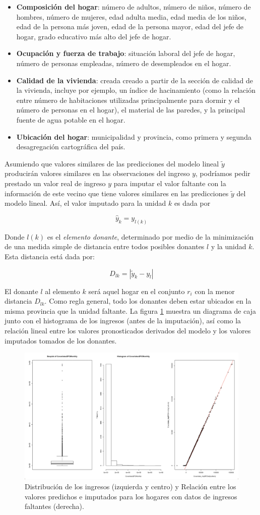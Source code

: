 \documentclass[
  12pt,
  spanish,
]{book}
\providecommand{\tightlist}{%
  \setlength{\itemsep}{0pt}\setlength{\parskip}{0pt}}
\begin{document}
\begin{itemize}
\tightlist
\item
  \textbf{Composición del hogar}: número de adultos, número de niños, número de hombres, número de mujeres, edad adulta media, edad media de los niños, edad de la persona más joven, edad de la persona mayor, edad del jefe de hogar, grado educativo más alto del jefe de hogar.
\item
  \textbf{Ocupación y fuerza de trabajo}: situación laboral del jefe de hogar, número de personas empleadas, número de desempleados en el hogar.
\item
  \textbf{Calidad de la vivienda}: creada creado a partir de la sección de calidad de la vivienda, incluye por ejemplo, un índice de hacinamiento (como la relación entre número de habitaciones utilizadas principalmente para dormir y el número de personas en el hogar), el material de las paredes, y la principal fuente de agua potable en el hogar.
\item
  \textbf{Ubicación del hogar}: municipalidad y provincia, como primera y segunda desagregación cartográfica del país.
\end{itemize}

Asumiendo que valores similares de las predicciones del modelo lineal \(\tilde y\) producirán valores similares en las observaciones del ingreso \(y\), podríamos pedir prestado un valor real de ingreso \(y\) para imputar el valor faltante con la información de este vecino que tiene valores similares en las predicciones \(\tilde y\) del modelo lineal. Así, el valor imputado para la unidad \(k\) es dada por

\[\hat{y}_k = y_{l(k)}\]

Donde \(l(k)\) es el \emph{elemento donante}, determinado por medio de la minimización de una medida simple de distancia entre todos posibles donantes \(l\) y la unidad \(k\). Esta distancia está dada por:

\[
D_{lk} = |\tilde y_k - y_l|
\]

El donante \(l\) al elemento \(k\) será aquel hogar en el conjunto \(r_i\) con la menor distancia \(D_{lk}\). Como regla general, todo los donantes deben estar ubicados en la misma provincia que la unidad faltante. La figura \ref{fig:fig10} muestra un diagrama de caja junto con el histograma de los ingresos (antes de la imputación), así como la relación lineal entre los valores pronosticados derivados del modelo y los valores imputados tomados de los donantes.

\begin{figure}
\includegraphics[width=0.5\linewidth]{Pics/10} \caption{Distribución de los ingresos (izquierda y centro) y Relación entre los valores predichos e imputados para los hogares con datos de ingresos faltantes (derecha).}\label{fig:fig10}
\end{figure}
\end{document}
